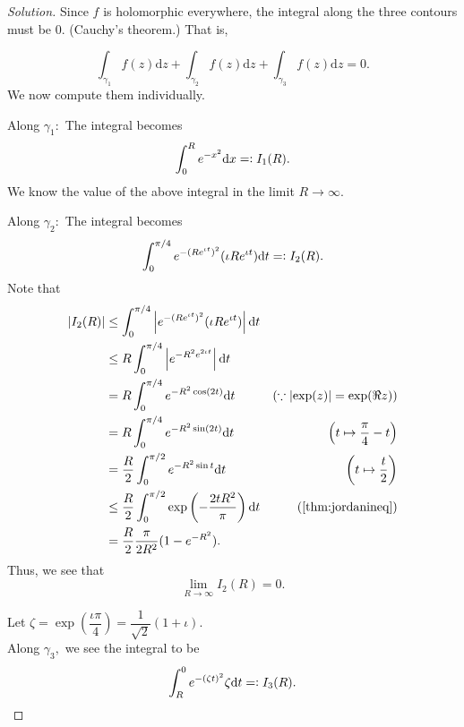 \documentclass[12pt]{article}
\theoremstyle{definition}
\newenvironment{soln}{\begin{proof}[Solution]}{\end{proof}}
\begin{document}
\begin{enumerate}[leftmargin=*]
\begin{soln}
    	Since $f$ is holomorphic everywhere, the integral along the three contours must be $0.$ (Cauchy's theorem.) That is,
    	
    	\begin{equation*}
    	    \int_{\gamma_1}f(z){\mathrm{d}}z + \int_{\gamma_2}f(z){\mathrm{d}}z + \int_{\gamma_3}f(z){\mathrm{d}}z = 0.
    	\end{equation*}
    	We now compute them individually.

    	Along $\gamma_1:$ The integral becomes
    	\begin{equation*} 
    		\int_{0}^{R} e^{-x^2} {\mathrm{d}}x =\vcentcolon I_1(R).
    	\end{equation*}
    	We know the value of the above integral in the limit $R \to \infty.$

    	Along $\gamma_2:$ The integral becomes
    	\begin{equation*} 
    		\int_{0}^{\pi/4} e^{-(Re^{\iota t})^2}(\iota Re^{\iota t}) {\mathrm{d}}t =\vcentcolon I_2(R).
    	\end{equation*}
    	Note that
    	\begin{align*} 
    		|I_2(R)| & \le \int_{0}^{\pi/4} \left|e^{-(Re^{\iota t})^2}(\iota Re^{\iota t})\right| {\mathrm{d}}t\\
    		&\le R \int_{0}^{\pi/4} \left|e^{-R^2e^{2\iota t}}\right| {\mathrm{d}}t\\
    		&= R \int_{0}^{\pi/4} e^{-R^2\cos(2t)} {\mathrm{d}}t & (\because \left|\exp(z)\right| = \exp(\Re z))\\
    		&= R \int_{0}^{\pi/4} e^{-R^2\sin(2t)} {\mathrm{d}}t & \left(t \mapsto \frac{\pi}{4} - t\right)\\
    		&= \dfrac{R}{2}\int_{0}^{\pi/2} e^{-R^2\sin t} {\mathrm{d}}t & \left(t \mapsto \dfrac{t}{2}\right)\\
    		&\le \dfrac{R}{2}\int_{0}^{\pi/2} \exp\left(-\dfrac{2tR^2}{\pi}\right) {\mathrm{d}}t & \text{(\cref{thm:jordanineq})}\\
    		&= \dfrac{R}{2}\dfrac{\pi}{2R^2}(1 - e^{-R^2}).	
    	\end{align*}
    	Thus, we see that
    	\begin{equation*} 
    		\lim_{R\to \infty}I_2(R) = 0.
    	\end{equation*}

    	Let $\zeta = \exp\left(\dfrac{\iota\pi}{4}\right) = \dfrac{1}{\sqrt{2}}(1 + \iota).$ \\
    	Along $\gamma_3,$ we see the integral to be
    	\begin{equation*} 
    		\int_{R}^{0} e^{-(\zeta t)^2}\zeta {\mathrm{d}}t =\vcentcolon I_3(R).
    	\end{equation*}


\end{soln}
\end{enumerate}
\end{document}
